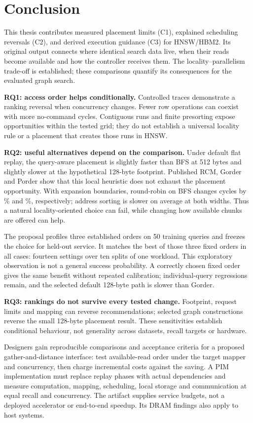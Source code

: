 \documentclass[11pt,a4paper]{report}
\begin{document}
\chapter{Conclusion}
This thesis contributes measured placement limits (C1), explained scheduling reversals (C2), and derived execution guidance (C3) for HNSW/HBM2. Its original output connects where identical search data live, when their reads become available and how the controller receives them. The locality--parallelism trade-off is established; these comparisons quantify its consequences for the evaluated graph search.

\textbf{RQ1: access order helps conditionally.} Controlled traces demonstrate a ranking reversal when concurrency changes. Fewer row operations can coexist with more no-command cycles. Contiguous runs and finite presorting expose opportunities within the tested grid; they do not establish a universal locality rule or a placement that creates those runs in HNSW.

\textbf{RQ2: useful alternatives depend on the comparison.} Under default flat replay, the query-aware placement is slightly faster than BFS at 512 bytes and slightly slower at the hypothetical 128-byte footprint. Published RCM, Gorder and Porder show that this local heuristic does not exhaust the placement opportunity. With expansion boundaries, round-robin on BFS changes cycles by \RoundRobinBFSMeanFloat\% and \RoundRobinBFSMeanCompact\%, respectively; address sorting is slower on average at both widths. Thus a natural locality-oriented choice can fail, while changing how available chunks are offered can help.

The proposal profiles three established orders on 50 training queries and freezes the choice for held-out service. It matches the best of those three fixed orders in all \ProfileOracleMatches{} cases: fourteen settings over ten splits of one workload. This exploratory observation is not a general success probability. A correctly chosen fixed order gives the same benefit without repeated calibration; individual-query regressions remain, and the selected default 128-byte path is slower than Gorder.

\textbf{RQ3: rankings do not survive every tested change.} Footprint, request limits and mapping can reverse recommendations; selected graph constructions reverse the small 128-byte placement result. These sensitivities establish conditional behaviour, not generality across datasets, recall targets or hardware.

Designers gain reproducible comparisons and acceptance criteria for a proposed gather-and-distance interface: test available-read order under the target mapper and concurrency, then charge incremental costs against the saving. A PIM implementation must replace replay phases with actual dependencies and measure computation, mapping, scheduling, local storage and communication at equal recall and concurrency. The artifact supplies service budgets, not a deployed accelerator or end-to-end speedup. Its DRAM findings also apply to host systems.
\end{document}
